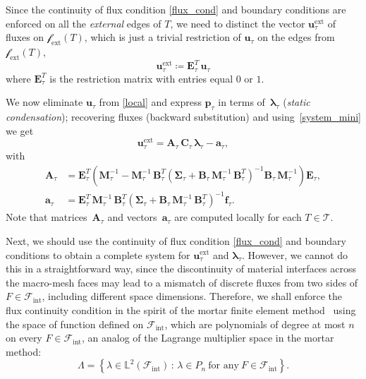 \documentclass[12pt]{article}
\newcommand{\vect}[1]{\boldsymbol{\mathbf{#1}}}
\newcommand{\bmesh}{{\vect{\mathcal T}}}
\newcommand{\mmesh}{{\vect{\mathcal \tau}}}
\newcommand{\bfaces}[1][]{{\vect{\mathcal F}_{\text{#1}}}}
\newcommand{\mfaces}[1][]{{\vect{\mathcal f}_{\text{#1}}}}
\newcommand{\LTwoSpace}[1][\Omega]{{\mathbb L^2\left({#1}\right)}}
\begin{document}
	Since the continuity of flux condition \eqref{flux_cond} and boundary conditions are enforced on all the \emph{external} edges of $T$, we need to distinct the vector ${\vect u}^\text{ext}_\mmesh$ of fluxes on $\mfaces[ext](T)$, which is just a trivial restriction of ${\vect u}_\mmesh$ on the edges  from $\mfaces[ext](T)$,
	\begin{equation}\label{system_mini}
		{\vect u}^\text{ext}_\mmesh \coloneqq \vect E_\mmesh^T\,{\vect u}_\mmesh
	\end{equation}
	where $\vect E_\mmesh^T$ is the restriction matrix with entries equal $0$ or $1$.
	
	We now eliminate ${\vect u}_\mmesh$ from \eqref{local} and express ${\vect p}_\mmesh$ in terms of~${\vect \lambda}_\mmesh$ (\textit{static condensation}); recovering fluxes (backward substitution) and using~\eqref{system_mini} we get
	\begin{equation}\label{mini_flux_dofs}
		{\vect u}^\text{ext}_\mmesh = \vect A_\mmesh\,\vect C_\mmesh\,{\vect \lambda}_\mmesh - {\vect a}_\mmesh,
	\end{equation}
	with
	\begin{align} \label{defA}
		\vect A_\mmesh &= \vect E^T_\mmesh \left( \vect M^{-1}_\mmesh - \vect M^{-1}_\mmesh\,\vect B^T_\mmesh \left( \vect \Sigma_\mmesh + \vect B_\mmesh\,\vect M^{-1}_\mmesh\,\vect B^{T}_\mmesh\right)^{-1} \vect B_\mmesh\,\vect M^{-1}_\mmesh \right) \vect E_\mmesh, \\
		{\vect a}_\mmesh &= \vect E^{T}_\mmesh\,\vect M^{-1}_\mmesh\,\vect B^T_\mmesh \left( \vect \Sigma_\mmesh + \vect B_\mmesh\,\vect M^{-1}_\mmesh\,\vect B^{T}_\mmesh\right)^{-1} {\vect f}_\mmesh.
	\end{align}
	Note that matrices~$\vect A_\mmesh$ and vectors~${\vect a}_\mmesh$ are computed locally for each $T\in\bmesh$.
	\smallskip
	
	Next, we should use the continuity of flux condition \eqref{flux_cond} and boundary conditions to obtain a complete system for ${\vect u}^\text{ext}_\mmesh$ and ${\vect \lambda}_\mmesh$. However, we cannot do this in a straightforward way, since the discontinuity of material interfaces across the macro-mesh faces may lead to a mismatch of discrete fluxes from two sides of $F\in\bfaces[int]$, including different space dimensions.
	Therefore, we shall enforce the flux continuity condition in the spirit of the mortar finite element method~\cite{mortar} using the space of function defined on $\bfaces[int]$, which are polynomials of degree at most $n$ on every $F\in\bfaces[int]$, an analog of the Lagrange multiplier space in the mortar method:
	\[
		\Lambda=\left\{\lambda\in \LTwoSpace[{\bfaces[int]}]\,:\, \lambda\in P_n~\text{for any}~F\in\bfaces[int]\right\}.
	\]
	
\end{document}
